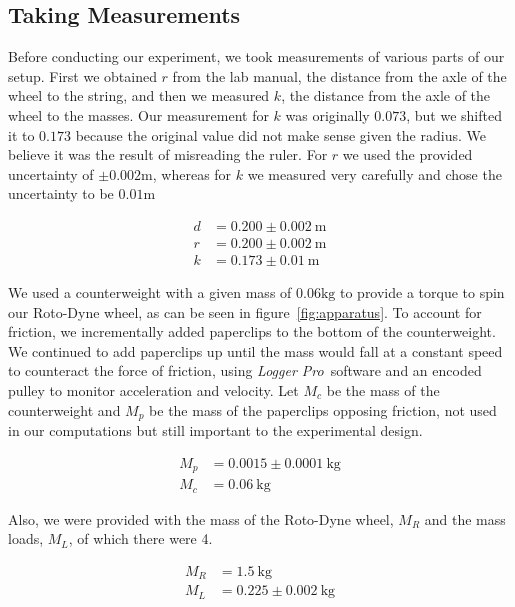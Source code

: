 \documentclass[coverpage]{article}
\newcommand{\softwareText}[1]{\textit{#1}\texttrademark}
\newcommand{\loggerpro}{\softwareText{Logger Pro}}
\newcommand{\rwheel}{Roto-Dyne wheel}
\begin{document}
	\subsection{Taking Measurements}
	
	Before conducting our experiment, we took measurements of various parts of our setup. First we obtained $r$ from the lab manual, the distance from the axle of the wheel to the string, and then we measured $k$, the distance from the axle of the wheel to the masses. Our measurement for $k$ was originally $0.073$, but we shifted it to $0.173$ because the original value did not make sense given the radius. We believe it was the result of misreading the ruler. For $r$ we used the provided uncertainty of $\pm 0.002 \text{m}$, whereas for $k$ we measured very carefully and chose the uncertainty to be $0.01 \text{m}$
	
	\begin{align}
		d&=0.200 \pm 0.002\ \text{m} \label{eq:def-d} \\
		r&=0.200 \pm 0.002\ \text{m} \label{eq:def-r} \\
		k&=0.173 \pm 0.01\ \text{m} \label{eq:def-k}
	\end{align}

	We used a counterweight with a given mass of $0.06\text{kg}$ to provide a torque to spin our \rwheel, as can be seen in figure~\ref{fig:apparatus}. To account for friction, we incrementally added paperclips to the bottom of the counterweight. We continued to add paperclips up until the mass would fall at a constant speed to counteract the force of friction, using \loggerpro~software and an encoded pulley to monitor acceleration and velocity. Let $M_c$ be the mass of the counterweight and $M_p$ be the mass of the paperclips opposing friction, not used in our computations but still important to the experimental design.
	
	\begin{align}
		M_p&=0.0015 \pm 0.0001\ \text{kg} \label{eq:def-mp} \\
		M_c&=0.06\ \text{kg} \label{eq:def-mc}
	\end{align}

	Also, we were provided with the mass of the \rwheel, $M_R$ and the mass loads, $M_L$, of which there were 4.
	
	\begin{align}
		M_R &= 1.5\ \text{kg} \label{eq:def-mr} \\
		M_L &= 0.225 \pm 0.002\ \text{kg} \label{eq:def-ml}
	\end{align}
	
\end{document}
